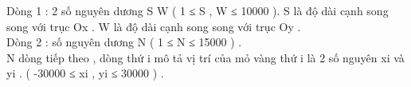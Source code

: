 Dòng 1 : 2 số nguyên dương S W ( 1 ≤ S , W ≤ 10000 ). S là độ dài cạnh song song với trục Ox . W là độ dài cạnh song song với trục Oy .   
\\   Dòng 2 : số nguyên dương N ( 1 ≤ N ≤ 15000 ) .   
\\   N dòng tiếp theo , dòng thứ i mô tả vị trí của mỏ vàng thứ i là 2 số nguyên xi và yi . ( -30000 ≤ xi , yi ≤ 30000 ) .